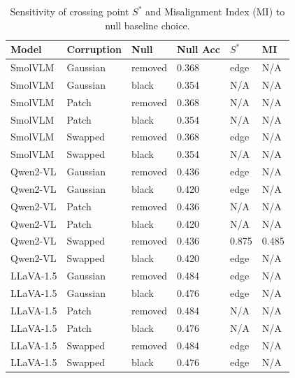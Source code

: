 \begin{table}[t]
\centering
\caption{Sensitivity of crossing point $S^*$ and Misalignment Index (MI) to null baseline choice.}
\label{tab:vlm-null-sensitivity}
{\footnotesize\setlength{\tabcolsep}{3pt}%
\begin{tabular}{llllll}
\toprule
\textbf{Model} & \textbf{Corruption} & Null & Null Acc & $S^*$ & MI \\
\midrule
SmolVLM   & Gaussian & removed & 0.368 & edge & N/A \\
SmolVLM   & Gaussian & black   & 0.354 & N/A  & N/A \\
SmolVLM   & Patch    & removed & 0.368 & N/A  & N/A \\
SmolVLM   & Patch    & black   & 0.354 & N/A  & N/A \\
SmolVLM   & Swapped  & removed & 0.368 & edge & N/A \\
SmolVLM   & Swapped  & black   & 0.354 & N/A  & N/A \\
Qwen2-VL  & Gaussian & removed & 0.436 & edge & N/A \\
Qwen2-VL  & Gaussian & black   & 0.420 & edge & N/A \\
Qwen2-VL  & Patch    & removed & 0.436 & N/A  & N/A \\
Qwen2-VL  & Patch    & black   & 0.420 & N/A  & N/A \\
Qwen2-VL  & Swapped  & removed & 0.436 & 0.875 & 0.485 \\
Qwen2-VL  & Swapped  & black   & 0.420 & edge & N/A \\
LLaVA-1.5 & Gaussian & removed & 0.484 & edge & N/A \\
LLaVA-1.5 & Gaussian & black   & 0.476 & edge & N/A \\
LLaVA-1.5 & Patch    & removed & 0.484 & N/A  & N/A \\
LLaVA-1.5 & Patch    & black   & 0.476 & N/A  & N/A \\
LLaVA-1.5 & Swapped  & removed & 0.484 & edge & N/A \\
LLaVA-1.5 & Swapped  & black   & 0.476 & edge & N/A \\
\bottomrule
\end{tabular}}
\end{table}
